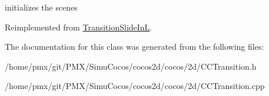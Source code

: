 initializes the scenes 

Reimplemented from \hyperlink{classTransitionSlideInL_abac332ac289d8ed399168d7a428be3b7}{Transition\+Slide\+InL}.



The documentation for this class was generated from the following files\+:\begin{DoxyCompactItemize}
\item 
/home/pmx/git/\+P\+M\+X/\+Simu\+Cocos/cocos2d/cocos/2d/C\+C\+Transition.\+h\item 
/home/pmx/git/\+P\+M\+X/\+Simu\+Cocos/cocos2d/cocos/2d/C\+C\+Transition.\+cpp\end{DoxyCompactItemize}
